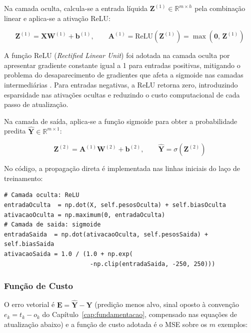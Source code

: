 Na camada oculta, calcula-se a entrada líquida $\mathbf{Z}^{(1)} \in \mathbb{R}^{m \times h}$ pela combinação linear e aplica-se a ativação ReLU:

\begin{equation}
\mathbf{Z}^{(1)} = \mathbf{X} \mathbf{W}^{(1)} + \mathbf{b}^{(1)}, \qquad \mathbf{A}^{(1)} = \text{ReLU}\!\left(\mathbf{Z}^{(1)}\right) = \max\!\left(\mathbf{0},\, \mathbf{Z}^{(1)}\right)
\label{eq:mlp_oculta}
\end{equation}

A função ReLU (\textit{Rectified Linear Unit}) foi adotada na camada oculta por apresentar gradiente constante igual a 1 para entradas positivas, mitigando o problema do desaparecimento de gradientes que afeta a sigmoide nas camadas intermediárias \cite{dsa2022}. Para entradas negativas, a ReLU retorna zero, introduzindo esparsidade nas ativações ocultas e reduzindo o custo computacional de cada passo de atualização.

Na camada de saída, aplica-se a função sigmoide para obter a probabilidade predita $\hat{\mathbf{Y}} \in \mathbb{R}^{m \times 1}$:

\begin{equation}
\mathbf{Z}^{(2)} = \mathbf{A}^{(1)} \mathbf{W}^{(2)} + \mathbf{b}^{(2)}, \qquad \hat{\mathbf{Y}} = \sigma\!\left(\mathbf{Z}^{(2)}\right)
\label{eq:mlp_saida}
\end{equation}

No código, a propagação direta é implementada nas linhas iniciais do laço de treinamento:

\begin{lstlisting}[caption={Propagação direta do MLP NumPy.}, label={lst:mlp_forward}]
# Camada oculta: ReLU
entradaOculta  = np.dot(X, self.pesosOculta) + self.biasOculta
ativacaoOculta = np.maximum(0, entradaOculta)
# Camada de saida: sigmoide
entradaSaida  = np.dot(ativacaoOculta, self.pesosSaida) + self.biasSaida
ativacaoSaida = 1.0 / (1.0 + np.exp(
                        -np.clip(entradaSaida, -250, 250)))
\end{lstlisting}

\subsubsection{Função de Custo}

O erro vetorial é $\mathbf{E} = \hat{\mathbf{Y}} - \mathbf{Y}$ (predição menos alvo, sinal oposto à convenção $e_k = t_k - o_k$ do Capítulo~\ref{cap:fundamentacao}, compensado nas equações de atualização abaixo) e a função de custo adotada é o MSE sobre os $m$ exemplos:

